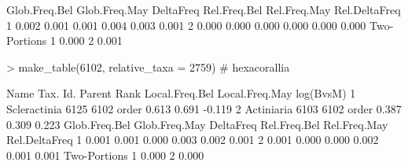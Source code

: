 \documentclass{article}
\begin{document}
\begin{Schunk}
\begin{Soutput}
  Glob.Freq.Bel Glob.Freq.May DeltaFreq Rel.Freq.Bel Rel.Freq.May Rel.DeltaFreq
1         0.002         0.001     0.001        0.004        0.003         0.001
2         0.000         0.000     0.000        0.000        0.000         0.000
  Two-Portions
1        0.000
2        0.001
\end{Soutput}
\begin{Sinput}
> make_table(6102, relative_taxa = 2759) # hexacorallia
\end{Sinput}
\begin{Soutput}
          Name Tax. Id. Parent  Rank Local.Freq.Bel Local.Freq.May log(BvsM)
1 Scleractinia     6125   6102 order          0.613          0.691    -0.119
2   Actiniaria     6103   6102 order          0.387          0.309     0.223
  Glob.Freq.Bel Glob.Freq.May DeltaFreq Rel.Freq.Bel Rel.Freq.May Rel.DeltaFreq
1         0.001         0.001     0.000        0.003        0.002         0.001
2         0.001         0.000     0.000        0.002        0.001         0.001
  Two-Portions
1        0.000
2        0.000
\end{Soutput}
\end{Schunk}
\end{document}

